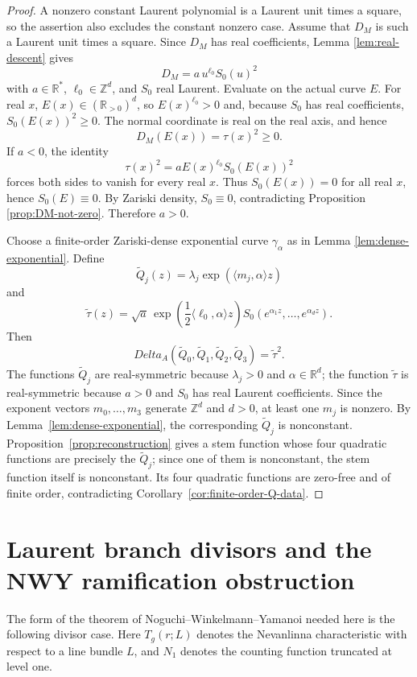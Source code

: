 \documentclass[11pt]{amsart}
\def\DeltaA{Delta_A}%
\numberwithin{equation}{section}
\theoremstyle{definition}
\theoremstyle{remark}
\newcommand{\RR}{\mathbb R}
\newcommand{\ZZ}{\mathbb Z}
\newcommand{\DeltaA}{\Delta_A}
\begin{document}
\begin{proof}
A nonzero constant Laurent polynomial is a Laurent unit times a square, so the assertion also excludes the constant nonzero case.  Assume that $D_M$ is such a Laurent unit times a square. Since $D_M$ has real coefficients, Lemma \ref{lem:real-descent} gives
\[
D_M=a\,u^{\ell_0} S_0(u)^2
\]
with $a\in\RR^*$, $\ell_0\in\ZZ^d$, and $S_0$ real Laurent. Evaluate on the actual curve $E$. For real $x$, $E(x)\in(\RR_{>0})^d$, so $E(x)^{\ell_0}>0$ and, because $S_0$ has real coefficients, $S_0(E(x))^2\ge0$.  The normal coordinate is real on the real axis, and hence
\[
D_M(E(x))=\tau(x)^2\ge0.
\]
If $a<0$, the identity
\[
\tau(x)^2=aE(x)^{\ell_0}S_0(E(x))^2
\]
forces both sides to vanish for every real $x$.  Thus $S_0(E(x))=0$ for all real $x$, hence $S_0(E)\equiv0$. By Zariski density, $S_0\equiv0$, contradicting Proposition \ref{prop:DM-not-zero}. Therefore $a>0$.

Choose a finite-order Zariski-dense exponential curve $\gamma_\alpha$ as in Lemma \ref{lem:dense-exponential}. Define
\[
\widetilde Q_j(z)=\lambda_j\exp(\langle m_j,\alpha\rangle z)
\]
and
\[
\widetilde\tau(z)=\sqrt a\,\exp\left(\frac12\langle\ell_0,\alpha\rangle z\right)S_0(e^{\alpha_1z},\dots,e^{\alpha_dz}).
\]
Then
\[
\DeltaA(\widetilde Q_0,\widetilde Q_1,\widetilde Q_2,\widetilde Q_3)=\widetilde\tau^2.
\]
The functions $\widetilde Q_j$ are real-symmetric because $\lambda_j>0$ and $\alpha\in\RR^d$; the function $\widetilde\tau$ is real-symmetric because $a>0$ and $S_0$ has real Laurent coefficients.  Since the exponent vectors $m_0,\ldots,m_3$ generate $\ZZ^d$ and $d>0$, at least one $m_j$ is nonzero. By Lemma~\ref{lem:dense-exponential}, the corresponding $\widetilde Q_j$ is nonconstant.  Proposition~\ref{prop:reconstruction} gives a stem function whose four quadratic functions are precisely the $\widetilde Q_j$; since one of them is nonconstant, the stem function itself is nonconstant.  Its four quadratic functions are zero-free and of finite order, contradicting Corollary~\ref{cor:finite-order-Q-data}.
\end{proof}

\section{Laurent branch divisors and the NWY ramification obstruction}
\label{sec:laurent-ramification}

The form of the theorem of Noguchi--Winkelmann--Yamanoi needed here is the following divisor case.  Here $T_g(r;L)$ denotes the Nevanlinna characteristic with respect to a line bundle $L$, and $N_1$ denotes the counting function truncated at level one.
\end{document}
